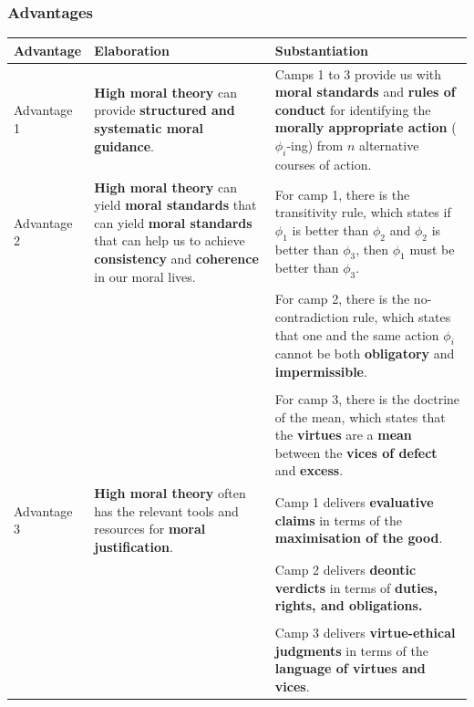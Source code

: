 \documentclass[11pt]{article}
\begin{document}
\subsubsection{Advantages}
\label{sec:org275888e}
\begin{center}
\begin{tabular}{|m{5em}|m{10em}|m{20em}|}
\hline
Advantage & Elaboration & Substantiation\\
\hline
Advantage 1 & \textbf{High moral theory} can provide \textbf{structured and systematic moral guidance}. & Camps 1 to 3 provide us with \textbf{moral standards} and \textbf{rules of conduct} for identifying the \textbf{morally appropriate action} (\(\phi_i\)-ing) from \(n\) alternative courses of action.\\
\hline
Advantage 2 & \textbf{High moral theory} can yield \textbf{moral standards} that can yield \textbf{moral standards} that can help us to achieve \textbf{consistency} and \textbf{coherence} in our moral lives. & For camp 1, there is the transitivity rule, which states if \(\phi_1\) is better than \(\phi_2\) and \(\phi_2\) is better than \(\phi_3\), then \(\phi_1\) must be better than \(\phi_3\).\\
 &  & For camp 2, there is the no-contradiction rule, which states that one and the same action \(\phi_i\) cannot be both \textbf{obligatory} and \textbf{impermissible}.\\
 &  & \\
 &  & For camp 3, there is the doctrine of the mean, which states that the \textbf{virtues} are a \textbf{mean} between the \textbf{vices of defect} and \textbf{excess}.\\
\hline
Advantage 3 & \textbf{High moral theory} often has the relevant tools and resources for \textbf{moral justification}. & Camp 1 delivers \textbf{evaluative claims} in terms of the \textbf{maximisation of the good}.\\
 &  & Camp 2 delivers \textbf{deontic verdicts} in terms of \textbf{duties, rights, and obligations.}\\
 &  & \\
 &  & Camp 3 delivers \textbf{virtue-ethical judgments} in terms of the \textbf{language of virtues and vices}.\\
\hline
\end{tabular}
\end{center}
 \newpage
\end{document}
